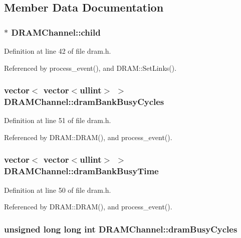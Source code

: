 \subsection{Member Data Documentation}
\subsubsection[{child}]{$\ast$ {\bf DRAMChannel::child}}\label{classDRAMChannel_54be82cd0a97fc3dc05816d566d79be2}




Definition at line 42 of file dram.h.

Referenced by process\_\-event(), and DRAM::SetLinks().
\subsubsection[{dramBankBusyCycles}]{\setlength{\rightskip}{0pt plus 5cm}vector$<$ vector$<${\bf ullint}$>$ $>$ {\bf DRAMChannel::dramBankBusyCycles}}\label{classDRAMChannel_222ef79694ef7c692f3fc52d30de2189}




Definition at line 51 of file dram.h.

Referenced by DRAM::DRAM(), and process\_\-event().
\subsubsection[{dramBankBusyTime}]{\setlength{\rightskip}{0pt plus 5cm}vector$<$ vector$<${\bf ullint}$>$ $>$ {\bf DRAMChannel::dramBankBusyTime}}\label{classDRAMChannel_b9e0801464c6c4c3c6440493e4456486}




Definition at line 50 of file dram.h.

Referenced by DRAM::DRAM(), and process\_\-event().
\subsubsection[{dramBusyCycles}]{\setlength{\rightskip}{0pt plus 5cm}unsigned long long int {\bf DRAMChannel::dramBusyCycles}}\label{classDRAMChannel_8d4533b55c2b44eb3f28ed99f3da1646}




